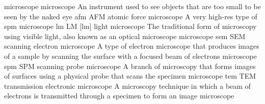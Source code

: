 \newglsXterm%
{microscope}%
{microscope}%
{An instrument used to see objects that are too small to be seen by the naked eye}%
\newglsXacronym%
{afm}%
{AFM}%
{atomic force microscope}%
{A very \gls{high-res} type of \gls{spm}}%
{microscope}%
\newglsXacronym%
{lm}%
{LM}%
[lm]%
{light microscope}%
{The traditional form of microscopy using visible light, also known as an optical microscope}%
{microscope}%
\newglsXacronym%
{sem}%
{SEM}%
{scanning electron microscope}%
{A type of electron microscope that produces images of a sample by scanning the surface with a focused beam of electrons}%
{microscope}%
\newglsXacronym%
{spm}%
{SPM}%
{scanning probe microscope}%
{A branch of microscopy that forms images of surfaces using a physical probe that scans the specimen}%
{microscope}%
\newglsXacronym%
{tem}%
{TEM}%
{transmission electronic microscope}%
{A microscopy technique in which a beam of electrons is transmitted through a specimen to form an image}%
{microscope}%